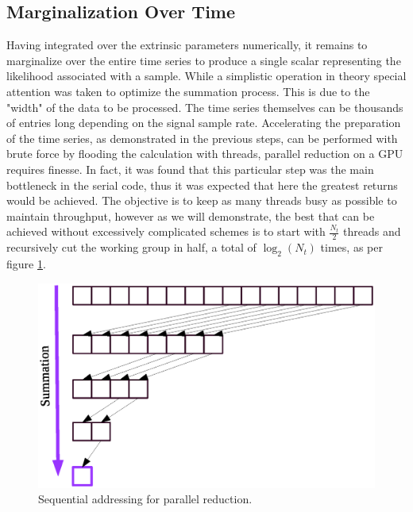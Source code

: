\subsection{Marginalization Over Time}
Having integrated over the extrinsic parameters numerically, it remains to marginalize over the entire time series to produce a single scalar representing the likelihood associated with a sample. While a simplistic operation in theory special attention was taken to optimize the summation process. This is due to the "width" of the data to be processed. The time series themselves can be thousands of entries long depending on the signal sample rate. Accelerating the preparation of the time series, as demonstrated in the previous steps, can be performed with brute force by flooding the calculation with threads, parallel reduction on a GPU requires finesse. In fact, it was found that this particular step was the main bottleneck in the serial code, thus it was expected that here the greatest returns would be achieved. The objective is to keep as many threads busy as possible to maintain throughput, however as we will demonstrate, the best that can be achieved without excessively complicated schemes is to start with $\frac{N_t}{2}$ threads and recursively cut the working group in half, a total of $\log_2(N_t)$ times, as per figure \ref{fig:recursive}. 


\begin{figure}
\label{fig:recursive}
\caption{Sequential addressing for parallel reduction.}
\begin{center}
\includegraphics[trim={0, 13cm, 0, 0}, clip, scale=0.5]{onedmarg.eps}
\end{center}
\end{figure}

